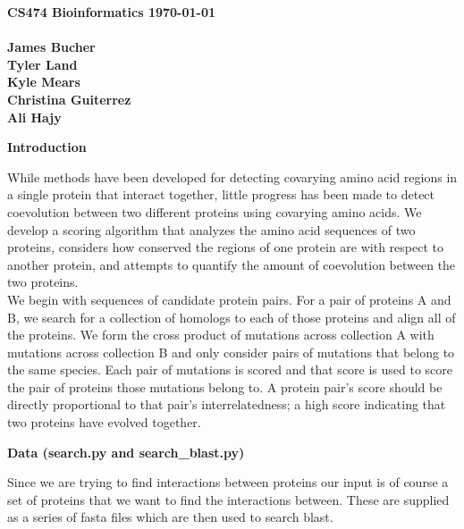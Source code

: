 \documentclass[11pt]{article}
\date{\today}
\begin{document}
\textbf{CS474 Bioinformatics \hfill \today\ \\
\\
James Bucher \\
Tyler Land \\
Kyle Mears \\
Christina Guiterrez \\
Ali Hajy}

\begin{center}
\textbf{Introduction}
\end{center}
While methods have been developed for detecting covarying amino acid regions in a single protein that interact together, little progress has been made to detect coevolution between two different proteins using covarying amino acids.  We develop a scoring algorithm that analyzes the amino acid sequences of two proteins, considers how conserved the regions of one protein are with respect to another protein, and attempts to quantify the amount of coevolution between the two proteins. \\

We begin with sequences of candidate protein pairs.  For a pair of proteins A and B, we search for a collection of homologs to each of those proteins and align all of the proteins.  We form the cross product of mutations across collection A with mutations across collection B and only consider pairs of mutations that belong to the same species.  Each pair of mutations is scored and that score is used to score the pair of proteins those mutations belong to.  A protein pair's score should be directly proportional to that pair's interrelatedness; a high score indicating that two proteins have evolved together.

\begin{center}
\textbf{Data (search.py and search\_blast.py)}
\end{center}
Since we are trying to find interactions between proteins our input is
of course a set of proteins that we want to find the interactions
between. These are supplied as a series of fasta files which are then
used to search blast. \\
\end{document}
